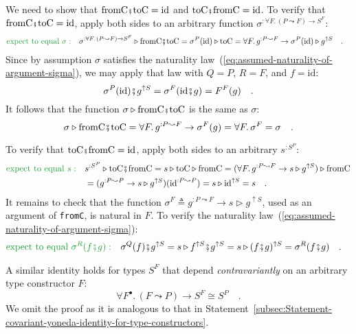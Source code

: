 We need to show that $\text{fromC}\bef\text{toC}=\text{id}$ and $\text{toC}\bef\text{fromC}=\text{id}$.
To verify that $\text{fromC}\bef\text{toC}=\text{id}$, apply both
sides to an arbitrary function $\sigma^{:\forall F.\,(P\leadsto F)\rightarrow S^{F}}$:
\begin{align*}
{\color{greenunder}\text{expect to equal }\sigma:}\quad & \sigma^{:\forall F.\,(P\leadsto F)\rightarrow S^{F}}\triangleright\text{fromC}\bef\text{toC}=\sigma^{P}(\text{id})\triangleright\text{toC}=\forall F.\,g^{:P\leadsto F}\rightarrow\sigma^{P}(\text{id})\triangleright g^{\uparrow S}\quad.
\end{align*}
Since by assumption $\sigma$ satisfies the naturality law~(\ref{eq:assumed-naturality-of-argument-sigma}),
we may apply that law with $Q=P$, $R=F$, and $f=\text{id}$:
\[
\sigma^{P}(\text{id})\bef g^{\uparrow S}=\sigma^{F}(\text{id}\bef g)=F^{F}(g)\quad.
\]
It follows that the function $\sigma\triangleright\text{fromC}\bef\text{toC}$
is the same as $\sigma$:
\[
\sigma\triangleright\text{fromC}\bef\text{toC}=\forall F.\,g^{:P\leadsto F}\rightarrow\sigma^{F}(g)=\forall F.\,\sigma^{F}=\sigma\quad.
\]

To verify that $\text{toC}\bef\text{fromC}=\text{id}$, apply both
sides to an arbitrary $s^{:S^{P}}$:
\begin{align*}
{\color{greenunder}\text{expect to equal }s:}\quad & s^{:S^{P}}\triangleright\text{toC}\bef\text{fromC}=s\triangleright\text{toC}\triangleright\text{fromC}=(\forall F.\,g^{:P\leadsto F}\rightarrow s\triangleright g^{\uparrow S})\triangleright\text{fromC}\\
 & =(g^{:P\leadsto P}\rightarrow s\triangleright g^{\uparrow S})(\text{id}^{:P\leadsto P})=s\triangleright\text{id}^{\uparrow S}=s\quad.
\end{align*}
It remains to check that the function $\sigma^{F}\triangleq g^{:P\leadsto F}\rightarrow s\triangleright g^{\uparrow S}$,
used as an argument of \lstinline!fromC!, is natural in $F$. To
verify the naturality law~(\ref{eq:assumed-naturality-of-argument-sigma}):
\begin{align*}
{\color{greenunder}\text{expect to equal }\sigma^{R}(f\bef g):}\quad & \sigma^{Q}(f)\bef g^{\uparrow S}=s\triangleright f^{\uparrow S}\bef g^{\uparrow S}=s\triangleright(f\bef g)^{\uparrow S}=\sigma^{R}(f\bef g)\quad.
\end{align*}

A similar identity holds for types $S^{F}$ that depend \emph{contravariantly}
on an arbitrary type constructor $F$:
\begin{equation}
\forall F^{\bullet}.\,(F\leadsto P)\rightarrow S^{F}\cong S^{P}\quad.\label{eq:contravariant-yoneda-identity-for-type-constructors}
\end{equation}
We omit the proof as it is analogous to that in Statement~\ref{subsec:Statement-covariant-yoneda-identity-for-type-constructors}.


